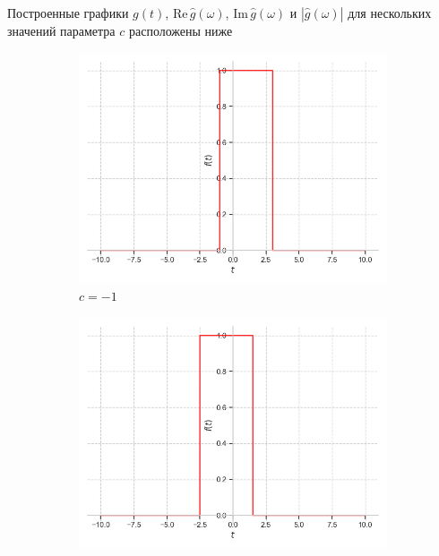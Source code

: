 \documentclass[a4paper, 16pt]{article}
\begin{document}
    \noindent Построенные графики $g(t)$, $\text{Re}\,{\hat{g}(\omega)}$,
    $\text{Im}\,{\hat{g}(\omega)}$ и $|\hat{g}(\omega)|$
    для нескольких значений параметра $c$ расположены ниже
    \begin{figure}[htbp]
        \centering
        \begin{subfigure}{0.3\textwidth}
            \centering
            \includegraphics[width=\linewidth]{sh_m1_rectf_int12.png}
            \caption{$c=-1$}
            \label{fig:shrectf_1}
        \end{subfigure}
        \hfill
        \begin{subfigure}{0.3\textwidth}
            \centering
            \includegraphics[width=\linewidth]{sh_zp5_rectf_int12.png}

\end{subfigure}
\end{figure}
\end{document}
